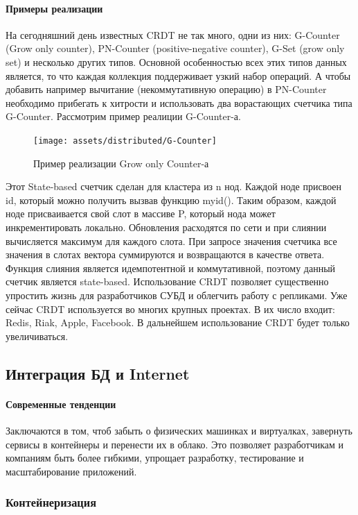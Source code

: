 \paragraph{Примеры реализации}
На сегодняшний день известных CRDT не так много, одни из них: G-Counter (Grow only counter), PN-Counter (positive-negative counter), G-Set (grow only set) и несколько других типов. Основной особенностью всех этих типов данных является, то что каждая коллекция поддерживает узкий набор операций. А чтобы добавить например вычитание (некоммутативную операцию) в PN-Counter необходимо прибегать к хитрости и использовать два ворастающих счетчика типа G-Counter. Рассмотрим пример реалиции G-Counter-а. 
\begin{figure}[H]
    \centering
    \texttt{[image: assets/distributed/G-Counter]}
    \caption{Пример реализации Grow only Counter-а}
    \label{fig:G-Counter}
\end{figure}
Этот State-based счетчик сделан для кластера из n нод. Каждой ноде присвоен id, который можно получить вызвав функцию myid(). Таким образом, каждой ноде присваивается свой слот в массиве P, который нода может инкрементировать локально. Обновления расходятся по сети и при слиянии вычисляется максимум для каждого слота. При запросе значения счетчика все значения в слотах вектора суммируются и возвращаются в качестве ответа. Функция слияния является идемпотентной и коммутативной, поэтому данный счетчик является state-based.
Использование CRDT позволяет существенно упростить жизнь для разработчиков СУБД и облегчить работу с репликами. Уже сейчас CRDT используется во многих крупных проектах. В их число входит: Redis, Riak, Apple, Facebook. В дальнейшем использование CRDT будет только увеличиваться. 

\subsection{Интеграция БД и Internet}

\paragraph{Современные тенденции}

Заключаются в том, чтоб забыть о физических машинках и виртуалках, завернуть сервисы в контейнеры и перенести их в облако. Это позволяет разработчикам и компаниям быть более гибкими, 
упрощает разработку, тестирование и масштабирование приложений.

\subsubsection{Контейнеризация}

